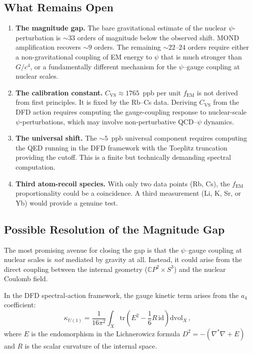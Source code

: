 \documentclass[aps,prd,twocolumn,superscriptaddress,nofootinbib]{revtex4-2}
\newcommand{\kap}{\kappa}
\newcommand{\fEM}{f_{\mathrm{EM}}}
\begin{document}
\subsection{What Remains Open}

\begin{enumerate}
\item \textbf{The magnitude gap.}  The bare gravitational estimate
of the nuclear $\psi$-perturbation is $\sim\!33$ orders of magnitude
below the observed shift.  MOND amplification recovers $\sim\!9$
orders.  The remaining $\sim\!22$--$24$ orders require either a
non-gravitational coupling of EM energy to $\psi$ that is much
stronger than $G/c^4$, or a fundamentally different mechanism for
the $\psi$--gauge coupling at nuclear scales.

\item \textbf{The calibration constant.}  $C_{\mathrm{VS}} \approx
1765$~ppb per unit $\fEM$ is not derived from first principles.
It is fixed by the Rb--Cs data.  Deriving $C_{\mathrm{VS}}$ from
the DFD action requires computing the gauge-coupling response to
nuclear-scale $\psi$-perturbations, which may involve non-perturbative
QCD--$\psi$ dynamics.

\item \textbf{The universal shift.}  The $\sim\!5$~ppb universal
component requires computing the QED running in the DFD framework
with the Toeplitz truncation providing the cutoff.  This is a finite
but technically demanding spectral computation.

\item \textbf{Third atom-recoil species.}  With only two data points
(Rb, Cs), the $\fEM$ proportionality could be a coincidence.  A third
measurement (Li, K, Sr, or Yb) would provide a genuine test.
\end{enumerate}

\subsection{Possible Resolution of the Magnitude Gap}

The most promising avenue for closing the gap is that the $\psi$--gauge
coupling at nuclear scales is \emph{not} mediated by gravity at all.
Instead, it could arise from the direct coupling between the internal
geometry ($\mathbb{C}P^2 \times S^3$) and the nuclear Coulomb field.

In the DFD spectral-action framework, the gauge kinetic term arises
from the $a_4$ coefficient:
\begin{equation}
\kap_{U(1)} = \frac{1}{16\pi^2}\int_X
\mathrm{tr}\left(E^2 - \frac{1}{6}R\,\mathrm{id}\right)
\mathrm{dvol}_X\,,
\end{equation}
where $E$ is the endomorphism in the Lichnerowicz formula
$D^2 = -(\nabla^*\nabla + E)$ and $R$ is the scalar curvature
of the internal space.
\end{document}
